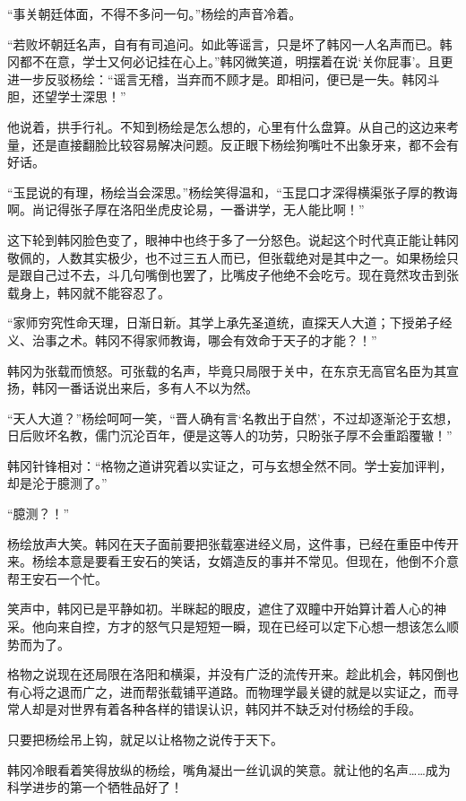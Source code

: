 “事关朝廷体面，不得不多问一句。”杨绘的声音冷着。

“若败坏朝廷名声，自有有司追问。如此等谣言，只是坏了韩冈一人名声而已。韩冈都不在意，学士又何必记挂在心上。”韩冈微笑道，明摆着在说‘关你屁事’。且更进一步反驳杨绘：“谣言无稽，当弃而不顾才是。即相问，便已是一失。韩冈斗胆，还望学士深思！”

他说着，拱手行礼。不知到杨绘是怎么想的，心里有什么盘算。从自己的这边来考量，还是直接翻脸比较容易解决问题。反正眼下杨绘狗嘴吐不出象牙来，都不会有好话。

“玉昆说的有理，杨绘当会深思。”杨绘笑得温和，“玉昆口才深得横渠张子厚的教诲啊。尚记得张子厚在洛阳坐虎皮论易，一番讲学，无人能比啊！”

这下轮到韩冈脸色变了，眼神中也终于多了一分怒色。说起这个时代真正能让韩冈敬佩的，人数其实极少，也不过三五人而已，但张载绝对是其中之一。如果杨绘只是跟自己过不去，斗几句嘴倒也罢了，比嘴皮子他绝不会吃亏。现在竟然攻击到张载身上，韩冈就不能容忍了。

“家师穷究性命天理，日渐日新。其学上承先圣道统，直探天人大道；下授弟子经义、治事之术。韩冈不得家师教诲，哪会有效命于天子的才能？！”

韩冈为张载而愤怒。可张载的名声，毕竟只局限于关中，在东京无高官名臣为其宣扬，韩冈一番话说出来后，多有人不以为然。

“天人大道？”杨绘呵呵一笑，“晋人确有言‘名教出于自然’，不过却逐渐沦于玄想，日后败坏名教，儒门沉沦百年，便是这等人的功劳，只盼张子厚不会重蹈覆辙！”

韩冈针锋相对：“格物之道讲究着以实证之，可与玄想全然不同。学士妄加评判，却是沦于臆测了。”

“臆测？！”

杨绘放声大笑。韩冈在天子面前要把张载塞进经义局，这件事，已经在重臣中传开来。杨绘本意是要看王安石的笑话，女婿造反的事并不常见。但现在，他倒不介意帮王安石一个忙。

笑声中，韩冈已是平静如初。半眯起的眼皮，遮住了双瞳中开始算计着人心的神采。他向来自控，方才的怒气只是短短一瞬，现在已经可以定下心想一想该怎么顺势而为了。

格物之说现在还局限在洛阳和横渠，并没有广泛的流传开来。趁此机会，韩冈倒也有心将之退而广之，进而帮张载铺平道路。而物理学最关键的就是以实证之，而寻常人却是对世界有着各种各样的错误认识，韩冈并不缺乏对付杨绘的手段。

只要把杨绘吊上钩，就足以让格物之说传于天下。

韩冈冷眼看着笑得放纵的杨绘，嘴角凝出一丝讥讽的笑意。就让他的名声……成为科学进步的第一个牺牲品好了！

